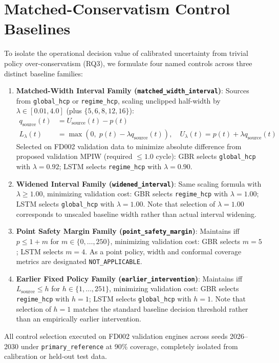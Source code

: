 \section{Matched-Conservatism Control Baselines}
To isolate the operational decision value of calibrated uncertainty from trivial policy over-conservatism (RQ3), we formulate four named controls across three distinct baseline families:
\begin{enumerate}
    \item \textbf{Matched-Width Interval Family (\texttt{matched\_width\_interval})}:
    Sources from \texttt{global\_hcp} or \texttt{regime\_hcp}, scaling unclipped half-width by $\lambda \in [0.01, 4.0]$ (plus $\{5, 6, 8, 12, 16\}$):
    \begin{align}
    q_{\text{source}}(t) &= U_{\text{source}}(t) - p(t) \\
    L_\lambda(t) &= \max(0, \; p(t) - \lambda q_{\text{source}}(t)), \quad U_\lambda(t) = p(t) + \lambda q_{\text{source}}(t)
    \end{align}
    Selected on FD002 validation data to minimize absolute difference from proposed validation MPIW (required $\le 1.0$ cycle): GBR selects \texttt{global\_hcp} with $\lambda=0.92$; LSTM selects \texttt{regime\_hcp} with $\lambda=0.90$.

    \item \textbf{Widened Interval Family (\texttt{widened\_interval})}:
    Same scaling formula with $\lambda \ge 1.00$, minimizing validation cost: GBR selects \texttt{regime\_hcp} with $\lambda=1.00$; LSTM selects \texttt{global\_hcp} with $\lambda=1.00$. Note that selection of $\lambda = 1.00$ corresponds to unscaled baseline width rather than actual interval widening.

    \item \textbf{Point Safety Margin Family (\texttt{point\_safety\_margin})}:
    Maintains iff $p \le 1 + m$ for $m \in \{0, \dots, 250\}$, minimizing validation cost: GBR selects $m=5$; LSTM selects $m=4$. As a point policy, width and conformal coverage metrics are designated \texttt{NOT\_APPLICABLE}.

    \item \textbf{Earlier Fixed Policy Family (\texttt{earlier\_intervention})}:
    Maintains iff $L_{\text{source}} \le h$ for $h \in \{1, \dots, 251\}$, minimizing validation cost: GBR selects \texttt{regime\_hcp} with $h=1$; LSTM selects \texttt{global\_hcp} with $h=1$. Note that selection of $h = 1$ matches the standard baseline decision threshold rather than an empirically earlier intervention.
\end{enumerate}
All control selection executed on FD002 validation engines across seeds 2026--2030 under \texttt{primary\_reference} at 90\% coverage, completely isolated from calibration or held-out test data.

